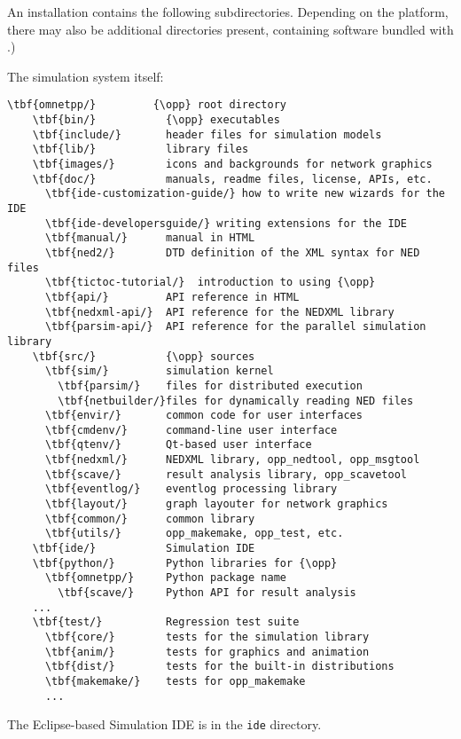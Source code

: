 An {\opp} installation contains the following subdirectories. Depending
on the platform, there may also be additional directories present, containing
software bundled with {\opp}.)

The simulation system itself:

\begin{Verbatim}[commandchars=\\\{\}]
  \tbf{omnetpp/}         {\opp} root directory
    \tbf{bin/}           {\opp} executables
    \tbf{include/}       header files for simulation models
    \tbf{lib/}           library files
    \tbf{images/}        icons and backgrounds for network graphics
    \tbf{doc/}           manuals, readme files, license, APIs, etc.
      \tbf{ide-customization-guide/} how to write new wizards for the IDE
      \tbf{ide-developersguide/} writing extensions for the IDE
      \tbf{manual/}      manual in HTML
      \tbf{ned2/}        DTD definition of the XML syntax for NED files
      \tbf{tictoc-tutorial/}  introduction to using {\opp}
      \tbf{api/}         API reference in HTML
      \tbf{nedxml-api/}  API reference for the NEDXML library
      \tbf{parsim-api/}  API reference for the parallel simulation library
    \tbf{src/}           {\opp} sources
      \tbf{sim/}         simulation kernel
        \tbf{parsim/}    files for distributed execution
        \tbf{netbuilder/}files for dynamically reading NED files
      \tbf{envir/}       common code for user interfaces
      \tbf{cmdenv/}      command-line user interface
      \tbf{qtenv/}       Qt-based user interface
      \tbf{nedxml/}      NEDXML library, opp_nedtool, opp_msgtool
      \tbf{scave/}       result analysis library, opp_scavetool
      \tbf{eventlog/}    eventlog processing library
      \tbf{layout/}      graph layouter for network graphics
      \tbf{common/}      common library
      \tbf{utils/}       opp_makemake, opp_test, etc.
    \tbf{ide/}           Simulation IDE
    \tbf{python/}        Python libraries for {\opp}
      \tbf{omnetpp/}     Python package name
        \tbf{scave/}     Python API for result analysis
	...
    \tbf{test/}          Regression test suite
      \tbf{core/}        tests for the simulation library
      \tbf{anim/}        tests for graphics and animation
      \tbf{dist/}        tests for the built-in distributions
      \tbf{makemake/}    tests for opp_makemake
      ...
\end{Verbatim}

The Eclipse-based Simulation IDE is in the \texttt{ide} directory.

